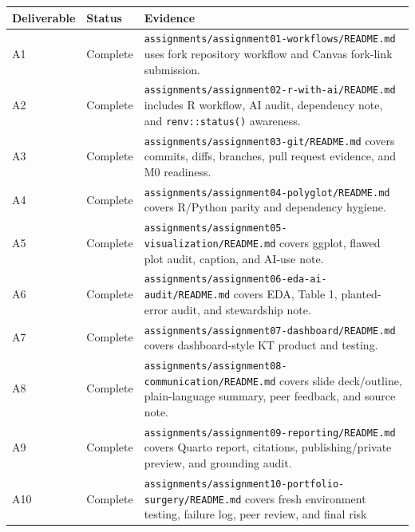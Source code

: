 \documentclass[
  letterpaper,
  DIV=11,
  numbers=noendperiod,
  oneside]{scrreprt}
\begin{document}
\begin{longtable}[]{@{}
  >{\raggedright\arraybackslash}p{}
  >{\raggedright\arraybackslash}p{}
  >{\raggedright\arraybackslash}p{}@{}}
\toprule\noalign{}
\begin{minipage}[b]{\linewidth}\raggedright
Deliverable
\end{minipage} & \begin{minipage}[b]{\linewidth}\raggedright
Status
\end{minipage} & \begin{minipage}[b]{\linewidth}\raggedright
Evidence
\end{minipage} \\
\midrule\noalign{}
\endhead
\bottomrule\noalign{}
\endlastfoot
A1 & Complete & \texttt{assignments/assignment01-workflows/README.md}
uses fork repository workflow and Canvas fork-link submission. \\
A2 & Complete & \texttt{assignments/assignment02-r-with-ai/README.md}
includes R workflow, AI audit, dependency note, and
\texttt{renv::status()} awareness. \\
A3 & Complete & \texttt{assignments/assignment03-git/README.md} covers
commits, diffs, branches, pull request evidence, and M0 readiness. \\
A4 & Complete & \texttt{assignments/assignment04-polyglot/README.md}
covers R/Python parity and dependency hygiene. \\
A5 & Complete &
\texttt{assignments/assignment05-visualization/README.md} covers ggplot,
flawed plot audit, caption, and AI-use note. \\
A6 & Complete & \texttt{assignments/assignment06-eda-ai-audit/README.md}
covers EDA, Table 1, planted-error audit, and stewardship note. \\
A7 & Complete & \texttt{assignments/assignment07-dashboard/README.md}
covers dashboard-style KT product and testing. \\
A8 & Complete &
\texttt{assignments/assignment08-communication/README.md} covers slide
deck/outline, plain-language summary, peer feedback, and source note. \\
A9 & Complete & \texttt{assignments/assignment09-reporting/README.md}
covers Quarto report, citations, publishing/private preview, and
grounding audit. \\
A10 & Complete &
\texttt{assignments/assignment10-portfolio-surgery/README.md} covers
fresh environment testing, failure log, peer review, and final risk

\end{longtable}
\end{document}
